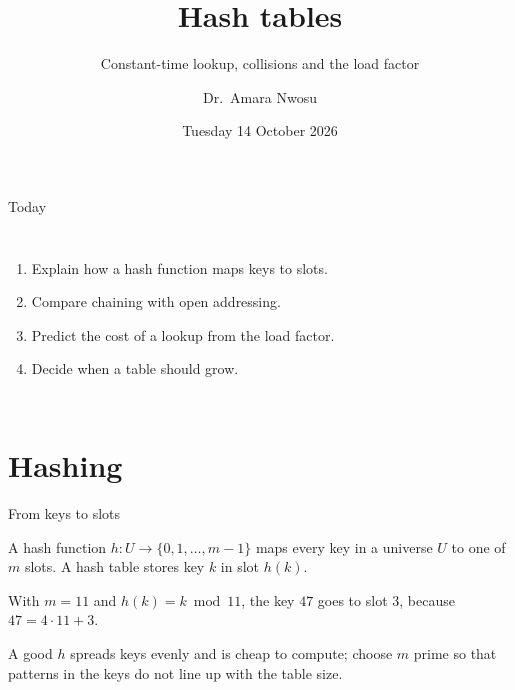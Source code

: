 \documentclass[aspectratio=169,11pt,t]{beamer}
\title[Hash tables]{Hash tables}
\subtitle{Constant-time lookup, collisions and the load factor}
\author{Dr.\ Amara Nwosu}
\institute{School of Computing, Northfield University}
\date{Tuesday 14 October 2026}
\begin{document}
{\lcstripfalse
\begin{frame}
  \titlepage
\end{frame}}

\begin{frame}{Today}
  \begin{columns}[T,onlytextwidth]
      \vspace{2mm}
      \lcagenda
      {\color{lcMuted}}\par\vspace{2mm}
      {\small
      \begin{enumerate}
        \item Explain how a hash function maps keys to slots.
        \item Compare chaining with open addressing.
        \item Predict the cost of a lookup from the load factor.
        \item Decide when a table should grow.
      \end{enumerate}}
  \end{columns}
\end{frame}

\section{Hashing}

\begin{frame}{From keys to slots}
  \begin{definitionbox}
    A hash function $h\colon U \to \{0, 1, \dots, m-1\}$ maps every key in a
    universe $U$ to one of $m$ slots. A hash table stores key $k$ in slot $h(k)$.
  \end{definitionbox}
  \begin{examplebox}
    With $m = 11$ and $h(k) = k \bmod 11$, the key $47$ goes to slot $3$,
    because $47 = 4 \cdot 11 + 3$.
  \end{examplebox}
  {\small\color{lcMuted}A good $h$ spreads keys evenly and is cheap to compute; choose $m$ prime
  so that patterns in the keys do not line up with the table size.\par}
\end{frame}
\end{document}
